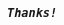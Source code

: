 \documentclass[UTF8, 16pt]{beamer}
\begin{document}
\begin{CJK*}{UTF8}{gbsn}
\begin{frame}[allowframebreaks]%
	\begin{center}
		\Huge\textbf{\textit{\texttt{Thanks!}}}
	\end{center}
\end{frame}



%
%
%

\end{CJK*}
\end{document}

